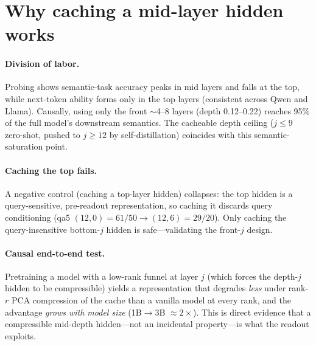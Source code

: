 \section{Why caching a mid-layer hidden works}
\label{sec:mechanism}
\paragraph{Division of labor.} Probing shows semantic-task accuracy peaks in
mid layers and falls at the top, while next-token ability forms only in the top
layers (consistent across Qwen and Llama). Causally, using only the front
$\sim$4--8 layers (depth 0.12--0.22) reaches 95\% of the full model's
downstream semantics. The cacheable depth ceiling ($j{\le}9$ zero-shot, pushed
to $j{\ge}12$ by self-distillation) coincides with this semantic-saturation
point.
\paragraph{Caching the top fails.} A negative control (caching a top-layer
hidden) collapses: the top hidden is a query-sensitive, pre-readout
representation, so caching it discards query conditioning
(qa5 $(12,0){=}61/50 \to (12,6){=}29/20$). Only caching the query-insensitive
bottom-$j$ hidden is safe---validating the front-$j$ design.
\paragraph{Causal end-to-end test.} Pretraining a model with a low-rank funnel
at layer $j$ (which forces the depth-$j$ hidden to be compressible) yields a
representation that degrades \emph{less} under rank-$r$ PCA compression of the
cache than a vanilla model at every rank, and the advantage \emph{grows with
model size} (1B$\to$3B $\approx 2\times$). This is direct evidence that a
compressible mid-depth hidden---not an incidental property---is what the
readout exploits.
